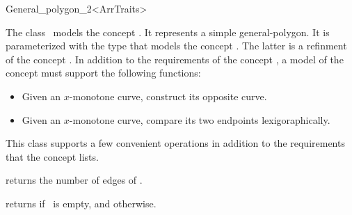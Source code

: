 \ccRefPageBegin

\begin{ccRefClass}{General_polygon_2<ArrTraits>}

\ccThreeToTwo

\ccDefinition
The class \ccRefName\ models the concept .
It represents a simple general-polygon. It is parameterized with the type
 that models the concept
. The latter is a refinment
of the concept . In addition to the
requirements of the concept , a
model of the concept  must
support the following functions:
\begin{itemize}
\item Given an $x$-monotone curve, construct its opposite curve.
\item Given an $x$-monotone curve, compare its two endpoints lexigoraphically.
\end{itemize} 

This class supports a few convenient operations in addition to the 
requirements that the concept  lists.

 
\ccTypes



\ccCreation
{}

% 
% 

\ccOperations
 {returns the number of edges of \ccVar.}

\ccModifiers


\ccPredicates
{returns  if \ccVar\ is empty, and  otherwise.}



\ccIsModel

\end{ccRefClass}
\ccRefPageEnd

